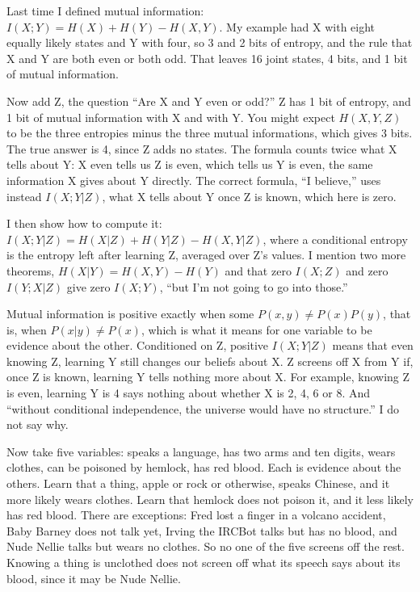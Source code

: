
Last time I defined mutual information: $I(X;Y) = H(X) + H(Y) - H(X,Y)$. My example had X with eight equally likely states and Y with four, so 3 and 2 bits of entropy, and the rule that X and Y are both even or both odd. That leaves 16 joint states, 4 bits, and 1 bit of mutual information.

Now add Z, the question ``Are X and Y even or odd?'' Z has 1 bit of entropy, and 1 bit of mutual information with X and with Y. You might expect $H(X,Y,Z)$ to be the three entropies minus the three mutual informations, which gives 3 bits. The true answer is 4, since Z adds no states. The formula counts twice what X tells about Y: X even tells us Z is even, which tells us Y is even, the same information X gives about Y directly. The correct formula, ``I believe,'' uses instead $I(X;Y|Z)$, what X tells about Y once Z is known, which here is zero. 

I then show how to compute it: $I(X;Y|Z) = H(X|Z) + H(Y|Z) - H(X,Y|Z)$, where a conditional entropy is the entropy left after learning Z, averaged over Z's values. I mention two more theorems, $H(X|Y) = H(X,Y) - H(Y)$ and that zero $I(X;Z)$ and zero $I(Y;X|Z)$ give zero $I(X;Y)$, ``but I'm not going to go into those.'' 

Mutual information is positive exactly when some $P(x,y) \neq P(x)P(y)$, that is, when $P(x|y) \neq P(x)$, which is what it means for one variable to be evidence about the other. Conditioned on Z, positive $I(X;Y|Z)$ means that even knowing Z, learning Y still changes our beliefs about X. Z screens off X from Y if, once Z is known, learning Y tells nothing more about X. For example, knowing Z is even, learning Y is 4 says nothing about whether X is 2, 4, 6 or 8. And ``without conditional independence, the universe would have no structure.'' I do not say why.

Now take five variables: speaks a language, has two arms and ten digits, wears clothes, can be poisoned by hemlock, has red blood. Each is evidence about the others. Learn that a thing, apple or rock or otherwise, speaks Chinese, and it more likely wears clothes. Learn that hemlock does not poison it, and it less likely has red blood. There are exceptions: Fred lost a finger in a volcano accident, Baby Barney does not talk yet, Irving the IRCBot talks but has no blood, and Nude Nellie talks but wears no clothes. So no one of the five screens off the rest. Knowing a thing is unclothed does not screen off what its speech says about its blood, since it may be Nude Nellie.

